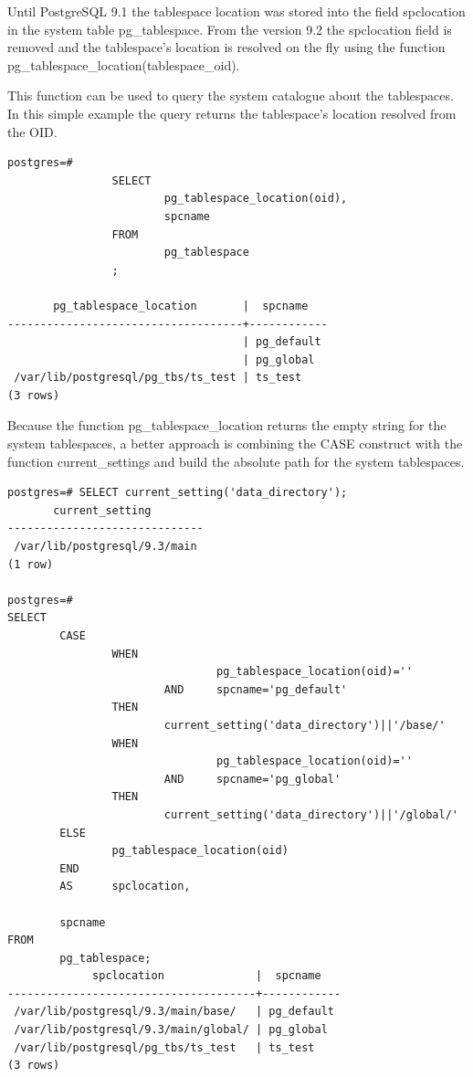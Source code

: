Until PostgreSQL 9.1 the tablespace location was stored into the field spclocation in the system table 
pg\_tablespace. From the version 9.2 the spclocation field is removed and the 
tablespace's location is resolved on the fly using the function 
pg\_tablespace\_location(tablespace\_oid).\newline

This function can be used to query the system catalogue about the tablespaces. In this simple example the 
query returns the tablespace's location resolved from the OID. 

\begin{lstlisting}[style=pgsql]
postgres=# 
                SELECT 
                        pg_tablespace_location(oid),
                        spcname 
                FROM 
                        pg_tablespace
                ;
        
       pg_tablespace_location       |  spcname   
------------------------------------+------------
                                    | pg_default
                                    | pg_global
 /var/lib/postgresql/pg_tbs/ts_test | ts_test
(3 rows)

\end{lstlisting}

Because the function pg\_tablespace\_location returns the empty string for the system tablespaces, a better 
approach is combining the CASE construct with the function current\_settings and build the absolute path 
for the system tablespaces.

\begin{lstlisting}[style=pgsql]
 postgres=# SELECT current_setting('data_directory');
       current_setting        
------------------------------
 /var/lib/postgresql/9.3/main
(1 row)

postgres=# 
SELECT 
        CASE
                WHEN 
                                pg_tablespace_location(oid)=''
                        AND     spcname='pg_default'
                THEN
                        current_setting('data_directory')||'/base/'
                WHEN 
                                pg_tablespace_location(oid)=''
                        AND     spcname='pg_global'
                THEN
                        current_setting('data_directory')||'/global/'
        ELSE
                pg_tablespace_location(oid)
        END
        AS      spclocation,
                
        spcname 
FROM 
        pg_tablespace;
             spclocation              |  spcname   
--------------------------------------+------------
 /var/lib/postgresql/9.3/main/base/   | pg_default
 /var/lib/postgresql/9.3/main/global/ | pg_global
 /var/lib/postgresql/pg_tbs/ts_test   | ts_test
(3 rows)

\end{lstlisting}

